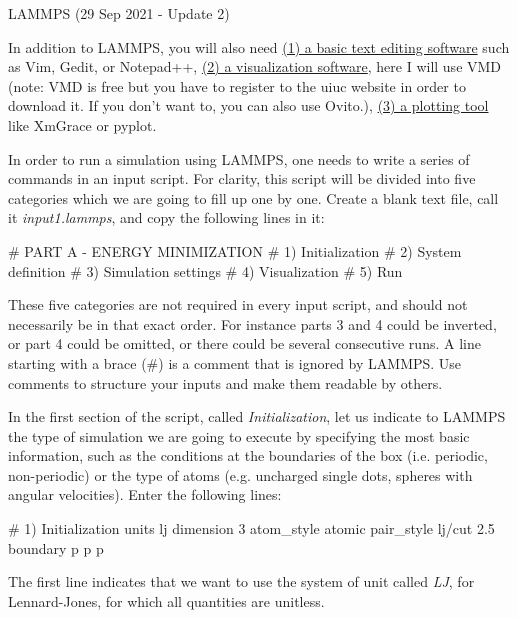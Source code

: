 \begin{lcverbatim}
LAMMPS (29 Sep 2021 - Update 2)
\end{lcverbatim}

\noindent In addition to LAMMPS, you will also need \href{https://help.gnome.org/users/gedit/stable/}{(1) a basic text editing software}
such as Vim, Gedit, or Notepad++, \href{https://www.ks.uiuc.edu/Research/vmd/}{(2) a visualization software}, here I
will use VMD (note: VMD is free but you have to register to
the uiuc website in order to download it. If you don't want
to, you can also use Ovito.), \href{https://plasma-gate.weizmann.ac.il/Grace/}{(3) a plotting tool} like
XmGrace or pyplot.

In order to run a simulation using LAMMPS, one needs to
write a series of commands in an input script. For clarity,
this script will be divided into five categories which we are going to
fill up one by one. Create a blank text file, call it
\textit{input1.lammps}, and copy the following lines in it:

\begin{lcverbatim}
# PART A - ENERGY MINIMIZATION
# 1) Initialization
# 2) System definition
# 3) Simulation settings
# 4) Visualization
# 5) Run
\end{lcverbatim}

\noindent These five categories are not required in every
input script, and should not necessarily be in that
exact order. For instance parts 3 and 4 could be inverted, or
part 4 could be omitted, or there could be several
consecutive runs.
A line starting with a brace ($\#$) is a comment
that is ignored by LAMMPS. Use comments to structure 
your inputs and make them readable by others.

In the first section of the script, called \textit{Initialization},
let us indicate to LAMMPS the type of simulation we are
going to execute by specifying the most basic information,
such as the conditions at the boundaries of the box (i.e.
periodic, non-periodic) or the type of atoms (e.g. uncharged
single dots, spheres with angular velocities). Enter the
following lines:

\begin{lcverbatim}
# 1) Initialization
units lj
dimension 3
atom_style atomic
pair_style lj/cut 2.5
boundary p p p
\end{lcverbatim}

\noindent The first line indicates that we want to
use the system of unit called \textit{LJ}, for Lennard-Jones, for which all quantities
are unitless. 

